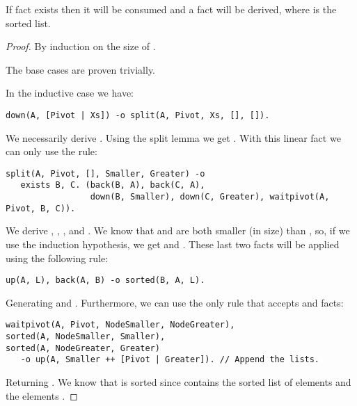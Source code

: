 \begin{theorem}
If fact  exists then it will be consumed and a  fact will be derived, where  is the sorted list.
\end{theorem}
\begin{proof}
By induction on the size of .

The base cases are proven trivially.

In the inductive case we have:
\begin{Verbatim}[fontsize=\codesize]
down(A, [Pivot | Xs]) -o split(A, Pivot, Xs, [], []).
\end{Verbatim}

We necessarily derive . Using the split
lemma we get . With this linear fact
we can only use the rule:

\begin{Verbatim}[fontsize=\codesize]
split(A, Pivot, [], Smaller, Greater) -o
   exists B, C. (back(B, A), back(C, A),
                 down(B, Smaller), down(C, Greater), waitpivot(A, Pivot, B, C)).
\end{Verbatim}

We derive , , ,
 and . We know that
 and  are both smaller (in size) than
, so, if we use the induction hypothesis, we get  and .  These last two facts will be applied
using the following rule:

\begin{Verbatim}[fontsize=\codesize]
up(A, L), back(A, B) -o sorted(B, A, L).
\end{Verbatim}

Generating  and .
Furthermore, we can use the only rule that accepts  and
 facts:

\begin{Verbatim}[fontsize=\codesize]
waitpivot(A, Pivot, NodeSmaller, NodeGreater),
sorted(A, NodeSmaller, Smaller),
sorted(A, NodeGreater, Greater)
   -o up(A, Smaller ++ [Pivot | Greater]). // Append the lists.
\end{Verbatim}

Returning .  We know that
 is sorted since  contains the
sorted list of elements  and  the elements .

\end{proof}

